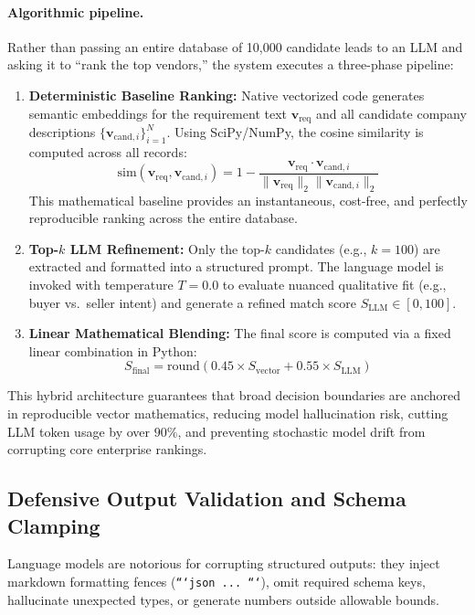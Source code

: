 \documentclass[10pt,a4paper,twocolumn]{article}
\begin{document}
\paragraph{Algorithmic pipeline.} Rather than passing an entire database of 10,000 candidate leads to an LLM and asking it to ``rank the top vendors,'' the system executes a three-phase pipeline:
\begin{enumerate}[leftmargin=*]
  \item \textbf{Deterministic Baseline Ranking:} Native vectorized code generates semantic embeddings for the requirement text $\mathbf{v}_{\text{req}}$ and all candidate company descriptions $\{\mathbf{v}_{\text{cand}, i}\}_{i=1}^{N}$. Using SciPy/NumPy, the cosine similarity is computed across all records:
  \begin{equation}
  \text{sim}(\mathbf{v}_{\text{req}}, \mathbf{v}_{\text{cand}, i}) = 1 - \frac{\mathbf{v}_{\text{req}} \cdot \mathbf{v}_{\text{cand}, i}}{\|\mathbf{v}_{\text{req}}\|_2 \|\mathbf{v}_{\text{cand}, i}\|_2}
  \end{equation}
  This mathematical baseline provides an instantaneous, cost-free, and perfectly reproducible ranking across the entire database.
  \item \textbf{Top-$k$ LLM Refinement:} Only the top-$k$ candidates (e.g., $k=100$) are extracted and formatted into a structured prompt. The language model is invoked with temperature $T=0.0$ to evaluate nuanced qualitative fit (e.g., buyer vs.\ seller intent) and generate a refined match score $S_{\text{LLM}} \in [0, 100]$.
  \item \textbf{Linear Mathematical Blending:} The final score is computed via a fixed linear combination in Python:
  \begin{equation}
  S_{\text{final}} = \text{round}\left(0.45 \times S_{\text{vector}} + 0.55 \times S_{\text{LLM}}\right)
  \end{equation}
\end{enumerate}
This hybrid architecture guarantees that broad decision boundaries are anchored in reproducible vector mathematics, reducing model hallucination risk, cutting LLM token usage by over $90\%$, and preventing stochastic model drift from corrupting core enterprise rankings.

\subsection{Defensive Output Validation and Schema Clamping}
Language models are notorious for corrupting structured outputs: they inject markdown formatting fences (\texttt{```json ... ```}), omit required schema keys, hallucinate unexpected types, or generate numbers outside allowable bounds.
\end{document}
